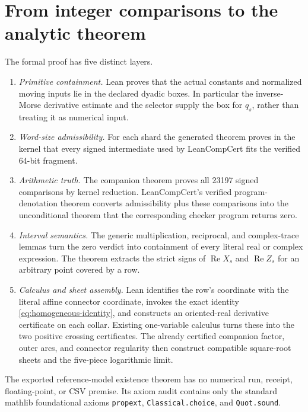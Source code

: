 \documentclass[11pt]{article}
\newcommand{\re}{\operatorname{Re}}
\begin{document}
\section{From integer comparisons to the analytic theorem}

The formal proof has five distinct layers.

\begin{enumerate}
\item \emph{Primitive containment.}  Lean proves that the actual constants and normalized moving
inputs lie in the declared dyadic boxes.  In particular the inverse-Morse derivative estimate and
the selector supply the box for \(q_s\), rather than treating it as numerical input.

\item \emph{Word-size admissibility.}  For each shard the generated theorem
 proves in the kernel that every signed intermediate used
by LeanCompCert fits the verified 64-bit fragment.

\item \emph{Arithmetic truth.}  The companion theorem
 proves all 23197 signed comparisons by kernel reduction.
LeanCompCert's verified program-denotation theorem converts admissibility plus these comparisons
into the unconditional theorem that the corresponding checker program returns zero.

\item \emph{Interval semantics.}  The generic multiplication, reciprocal, and complex-trace
lemmas turn the zero verdict into containment of every literal real or complex expression.
The theorem  extracts the strict signs of
\(\re X_s\) and \(\re Z_s\) for an arbitrary point covered by a row.

\item \emph{Calculus and sheet assembly.}  Lean identifies the row's coordinate with the literal
affine connector coordinate, invokes the exact identity
\eqref{eq:homogeneous-identity}, and constructs an
oriented-real derivative certificate on each collar.  Existing one-variable calculus turns
these into the two positive crossing certificates.  The already certified companion factor,
outer arcs, and connector regularity then construct compatible square-root sheets and the
five-piece logarithmic limit.
\end{enumerate}

The exported reference-model existence theorem has no numerical run,
receipt, floating-point, or CSV premise.  Its axiom audit contains only the standard mathlib
foundational axioms \texttt{propext}, \texttt{Classical.choice}, and \texttt{Quot.sound}.
\end{document}
